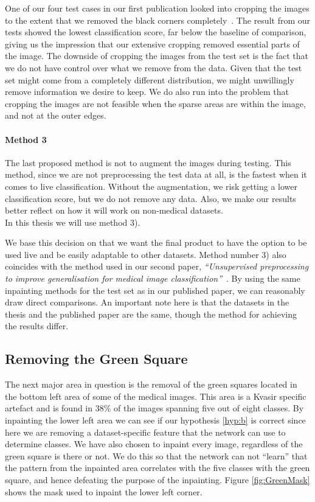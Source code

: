 One of our four test cases in our first publication looked into cropping the images to the extent that we removed the black corners completely~\cite{26254}. The result from our tests showed the lowest classification score, far below the baseline of comparison, giving us the impression that our extensive cropping removed essential parts of the image. 
The downside of cropping the images from the test set is the fact that we do not have control over what we remove from the data. Given that the test set might come from a completely different distribution, we might unwillingly remove information we desire to keep. We do also run into the problem that cropping the images are not feasible when the sparse areas are within the image, and not at the outer edges.

\paragraph{Method 3}
The last proposed method is not to augment the images during testing. This method, since we are not preprocessing the test data at all, is the fastest when it comes to live classification. Without the augmentation, we risk getting a lower classification score, but we do not remove any data. Also, we make our results better reflect on how it will work on non-medical datasets.\\


In this thesis we will use method 3). 

We base this decision on that we want the final product to have the option to be used live and be easily adaptable to other datasets. 
Method number 3) also coincides with the method used in our second paper, \textit{``Unsupervised preprocessing to improve generalisation for medical image classification''}~\cite{Mathias2019IEEpaper}. By using the same inpainting methods for the test set as in our published paper, we can reasonably draw direct comparisons.
An important note here is that the datasets in the thesis and the published paper are the same, though the method for achieving the results differ.


\subsection{Removing the Green Square}
The next major area in question is the removal of the green squares located in the bottom left area of some of the medical images.  This area is a Kvasir specific artefact and is found in 38\% of the images spanning five out of eight classes. 
By inpainting the lower left area we can see if our hypothesis \ref{hyp:b} is correct since here we are removing a dataset-specific feature that the network can use to determine classes. 
We have also chosen to inpaint every image, regardless of the green square is there or not. We do this so that the network can not ``learn'' that the pattern from the inpainted area correlates with the five classes with the green square, and hence defeating the purpose of the inpainting. Figure \ref{fig:GreenMask} shows the mask used to inpaint the lower left corner.

